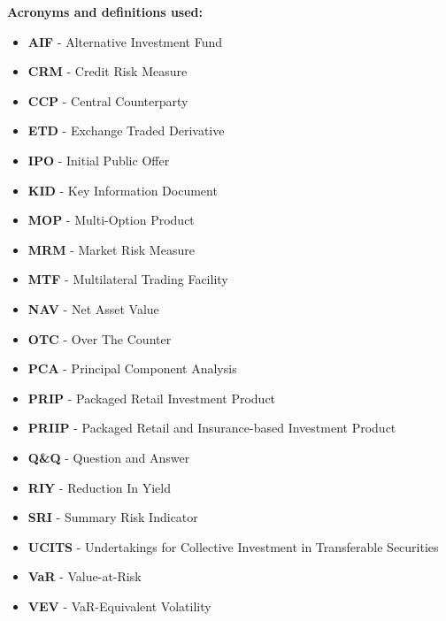 \textbf{Acronyms and definitions used:}
\begin{itemize}
	\item \textbf{\color{blue}AIF} - Alternative Investment Fund
	\item \textbf{\color{blue}CRM} - Credit Risk Measure
	\item \textbf{\color{blue}CCP} - Central Counterparty
	\item \textbf{\color{blue}ETD} - Exchange Traded Derivative
	\item \textbf{\color{blue}IPO} - Initial Public Offer
	\item \textbf{\color{blue}KID} - Key Information Document
	\item \textbf{\color{blue}MOP} - Multi-Option Product
	\item \textbf{\color{blue}MRM} - Market Risk Measure
	\item \textbf{\color{blue}MTF} - Multilateral Trading Facility
	\item \textbf{\color{blue}NAV} - Net Asset Value
	\item \textbf{\color{blue}OTC} - Over The Counter
	\item \textbf{\color{blue}PCA} - Principal Component Analysis
	\item \textbf{\color{blue}PRIP} - Packaged Retail Investment Product
	\item \textbf{\color{blue}PRIIP} - Packaged Retail and Insurance-based Investment Product
	\item \textbf{\color{blue}Q\&Q} - Question and Answer
	\item \textbf{\color{blue}RIY} - Reduction In Yield
	\item \textbf{\color{blue}SRI} - Summary Risk Indicator
	\item \textbf{\color{blue}UCITS} - Undertakings for Collective Investment in Transferable Securities
	\item \textbf{\color{blue}VaR} - Value-at-Risk
	\item \textbf{\color{blue}VEV} - VaR-Equivalent Volatility
\end{itemize}